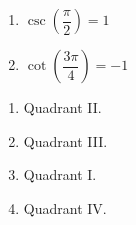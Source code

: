 \begin{multicols}{3}

\begin{enumerate}

\setcounter{enumi}{\value{HW}}

\item $\csc \left( \dfrac{\pi}{2} \right) = 1$ 
\item $\cot \left( \dfrac{3\pi}{4} \right) = -1$

\setcounter{HW}{\value{enumi}}

\end{enumerate}

\end{multicols}

\begin{multicols}{4}

\begin{enumerate}
\setcounter{enumi}{\value{HW}}

\item   Quadrant II.

\item Quadrant III.

\item  Quadrant I.

\item Quadrant IV.


\setcounter{HW}{\value{enumi}}
\end{enumerate}

\end{multicols}

